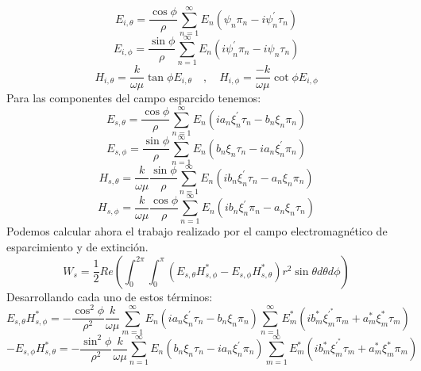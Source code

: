 \documentclass[letterpaper, 11pt]{article}
\begin{document}
\begin{equation*}
    E_{i,\theta}= \frac{\cos\phi}{\rho}\sum_{n=1}^\infty E_n(\psi_n \pi_n-i\psi_n^{'}\tau_n)
\end{equation*}
\begin{equation*}
    E_{i,\phi}= \frac{\sin\phi}{\rho}\sum_{n=1}^\infty E_n(i\psi_n^{'} \pi_n-i\psi_n\tau_n)
\end{equation*}
\begin{equation*}
    H_{i,\theta}=\frac{k}{\omega \mu}\tan\phi E_{i,\theta} \quad,\quad H_{i,\phi}=\frac{-k}{\omega \mu}\cot \phi E_{i,\phi}
\end{equation*}
Para las componentes del campo esparcido tenemos:
\begin{equation*}
    E_{s,\theta}= \frac{\cos\phi}{\rho}\sum_{n=1}^\infty E_n(ia_n \xi_n^{'} \tau_n-b_n\xi_n\pi_n)
\end{equation*}
\begin{equation*}
    E_{s,\phi}= \frac{\sin\phi}{\rho}\sum_{n=1}^\infty E_n(b_n \xi_n \tau_n-i a_n\xi_n^{'}\pi_n)
\end{equation*}
\begin{equation*}
    H_{s,\theta}=\frac{k}{\omega \mu} \frac{\sin\phi}{\rho}\sum_{n=1}^\infty E_n(i b_n \xi_n^{'} \tau_n- a_n\xi_n\pi_n)
\end{equation*}
\begin{equation*}
    H_{s,\phi}=\frac{k}{\omega \mu} \frac{\cos\phi}{\rho}\sum_{n=1}^\infty E_n(i b_n \xi_n^{'} \pi_n- a_n\xi_n\tau_n)
\end{equation*}
Podemos calcular ahora el trabajo realizado por el campo electromagnético de esparcimiento y de extinción.
\begin{equation}
    W_s=\frac{1}{2}Re\left( \int_0^{2\pi} \int_0^{\pi} (E_{s,\theta}H_{s,\phi}^*-E_{s,\phi}H_{s,\theta}^*)r^2\sin\theta d\theta d\phi\right)
\end{equation}
Desarrollando cada uno de estos términos:
\begin{equation*}
    E_{s,\theta}H_{s,\phi}^{*}=-\frac{\cos^2\phi}{\rho^2}\frac{k}{\omega \mu}\sum_{m=1}^\infty E_n(ia_n \xi_n^{'} \tau_n-b_n\xi_n\pi_n)\sum_{n=1}^\infty E_m^*(ib_m^{*}\xi_m^{{'}^{*}}\pi_m+a_m^* \xi_m^*\tau_m)
\end{equation*}
\begin{equation*}
    -E_{s,\phi}H_{s,\theta}^{*}=-\frac{\sin^2\phi}{\rho^2}\frac{k}{\omega \mu}\sum_{n=1}^\infty E_n(b_n \xi_n \tau_n-ia_n\xi_n^{'}\pi_n)\sum_{m=1}^\infty E_m^*(ib_m^{*}\xi_m^{{'}^{*}}\tau_m+a_m^* \xi_m^*\pi_m)
\end{equation*}
\end{document}
